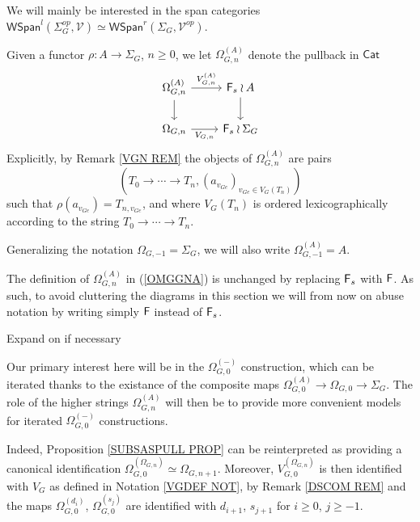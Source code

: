 \documentclass[a4paper,10pt]{article}%
\begin{document}
We will mainly be interested in the span categories 
$\mathsf{WSpan}^l(\Sigma_G^{op},\mathcal{V})\simeq 
\mathsf{WSpan}^r(\Sigma_G,\mathcal{V}^{op})$.


\begin{notation}\label{OMEGAGNA NOT}
	Given a functor $\rho \colon A \to \Sigma_G$, $n \geq 0$, we let $\Omega^{(A)}_{G,n}$ denote the pullback in $\mathsf{Cat}$
\begin{equation}\label{OMGGNA}
	\begin{tikzcd}
	\Omega_{G,n}^{(A)} \ar{r}{V_{G,n}^{(A)}} \ar{d}& 
	\Fin_s \wr A \ar{d}
\\
	\Omega_{G,n} \ar{r}[swap]{V_{G,n}} &
	\Fin_s \wr \Sigma_G
	\end{tikzcd}
\end{equation}
Explicitly, by Remark \ref{VGN REM}
the objects of $\Omega_{G,n}^{(A)}$ are pairs 
\begin{equation}\label{OMEGAGNA EQ}
(T_0 \to \cdots \to T_n,
(a_{v_{G e}})_{v_{G e} \in V_G(T_n)})
\end{equation}
such that $\rho(a_{v_{G e}}) = T_{n,v_{G e}}$, and
where $V_G(T_n)$ is ordered lexicographically
according to the string $T_0 \to \cdots \to T_n$.
\end{notation}

\begin{remark}
	Generalizing the notation $\Omega_{G,-1} = \Sigma_G$, we will also write $\Omega^{(A)}_{G,-1} = A$.
\end{remark}


\begin{remark}
The definition of $\Omega_{G,n}^{(A)}$ in (\ref{OMGGNA})
is unchanged by replacing $\mathsf{F}_s$ with $\mathsf{F}$. 
As such, to avoid cluttering the diagrams in this section we will from now on abuse notation by writing simply $\mathsf{F}$ instead of $\mathsf{F}_s$.
\end{remark}

{\color{red} Expand on if necessary}


Our primary interest here will be in the 
$\Omega_{G,0}^{(\minus)}$ construction,
which can be iterated thanks to the existance of the composite maps
$\Omega_{G,0}^{(A)} \to \Omega_{G,0} \to \Sigma_G$.
The role of the higher strings $\Omega_{G,n}^{(A)}$ will then be to provide more convenient models for iterated 
$\Omega_{G,0}^{(\minus)}$ constructions.


Indeed, Proposition \ref{SUBSASPULL PROP} can be reinterpreted as providing a canonical identification
$\Omega_{G,0}^{(\Omega_{G,n})} \simeq \Omega_{G,n+1}$.
Moreover, $V_{G,0}^{(\Omega_{G,n})}$ is then identified with 
$V_G$ as defined in Notation \ref{VGDEF NOT}, by Remark \ref{DSCOM REM} and the maps
$\Omega_{G,0}^{(d_i)}$, $\Omega_{G,0}^{(s_{j})}$ are identified with
$d_{i+1}$, $s_{j+1}$ for $i \geq 0$, $j \geq -1$.
\end{document}
